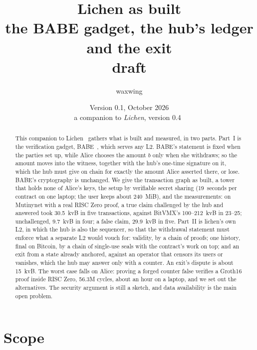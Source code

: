 \documentclass[11pt]{article}
\title{\textbf{Lichen as built}\\the BABE gadget, the hub's ledger and the exit\\[2pt]\large draft}
\author{waxwing}
\date{Version 0.1, October 2026\\[2pt]\small a companion to \emph{Lichen}, version 0.4~\cite{lichen}}
\begin{document}
\maketitle

\begin{abstract}
This companion to Lichen~\cite{lichen} gathers what is built and
measured, in two parts. Part~I is the verification gadget, BABE~\cite{babe},
which serves any L2. BABE's statement is fixed when the parties set up,
while Alice chooses the amount $b$ only when she withdraws; so the amount
moves into the witness, together with the hub's one-time signature on
it, which the hub must give on chain for exactly the amount Alice
asserted there, or lose. BABE's cryptography is unchanged. We give the
transaction graph as built, a tower that holds none of Alice's keys, the
setup by verifiable secret sharing (19~seconds per contract on one
laptop; the user keeps about 240~MiB), and the measurements: on Mutinynet
with a real RISC Zero proof, a true claim challenged by the hub and
answered took 30.5~kvB in five transactions, against BitVMX's
100--212~kvB in 23--25; unchallenged, 9.7~kvB in four; a false claim,
29.9~kvB in five. Part~II is lichen's own L2, in which the hub is also
the sequencer, so that the withdrawal statement must enforce what a
separate L2 would vouch for: validity, by a chain of proofs; one history,
final on Bitcoin, by a chain of single-use seals with the contract's
work on top; and an exit from a state already anchored, against an
operator that censors its users or vanishes, which the hub may answer
only with a counter. An exit's dispute is about 15~kvB. The worst case
falls on Alice: proving a forged counter false verifies a Groth16 proof
inside RISC Zero, 56.3M cycles, about an hour on a laptop, and we set out
the alternatives. The security argument is still a sketch, and data
availability is the main open problem.
\end{abstract}

\tableofcontents

\section{Scope}
\label{sec:scope}
\end{document}
